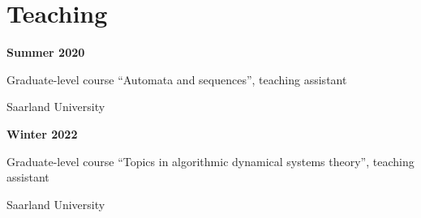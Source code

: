 \documentclass{article}
\begin{document}
	\section*{Teaching}
	\noindent\begin{minipage}{0.3\textwidth}
		\hspace{0.1cm} \textbf{Summer 2020}
	\end{minipage}
	\begin{minipage}{0.7\textwidth}
		Graduate-level course ``Automata and sequences'', teaching assistant\vspace{0.2cm} 
		
		Saarland University
	\end{minipage}
	
	\vspace{0.5cm}
	
	\noindent\begin{minipage}{0.3\textwidth}
		\hspace{0.1cm} \textbf{Winter 2022}
	\end{minipage}
	\begin{minipage}{0.7\textwidth}
		Graduate-level course ``Topics in algorithmic dynamical systems theory'', teaching assistant \vspace{0.2cm}
		
		Saarland University
	\end{minipage}

	\vspace*{0.3cm}
	
\end{document}
